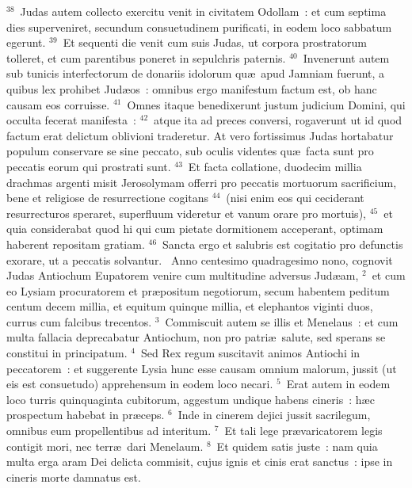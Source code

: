 ${}^{38}$~Judas autem collecto exercitu venit in civitatem Odollam~: et cum septima dies superveniret, secundum consuetudinem purificati, in eodem loco sabbatum egerunt.
${}^{39}$~Et sequenti die venit cum suis Judas, ut corpora prostratorum tolleret, et cum parentibus poneret in sepulchris paternis.
${}^{40}$~Invenerunt autem sub tunicis interfectorum de donariis idolorum qu\ae\ apud Jamniam fuerunt, a quibus lex prohibet Jud\ae os~: omnibus ergo manifestum factum est, ob hanc causam eos corruisse.
${}^{41}$~Omnes itaque benedixerunt justum judicium Domini, qui occulta fecerat manifesta~:
${}^{42}$~atque ita ad preces conversi, rogaverunt ut id quod factum erat delictum oblivioni traderetur. At vero fortissimus Judas hortabatur populum conservare se sine peccato, sub oculis videntes qu\ae\ facta sunt pro peccatis eorum qui prostrati sunt.
${}^{43}$~Et facta collatione, duodecim millia drachmas argenti misit Jerosolymam offerri pro peccatis mortuorum sacrificium, bene et religiose de resurrectione cogitans
${}^{44}$~(nisi enim eos qui ceciderant resurrecturos speraret, superfluum videretur et vanum orare pro mortuis),
${}^{45}$~et quia considerabat quod hi qui cum pietate dormitionem acceperant, optimam haberent repositam gratiam.
${}^{46}$~Sancta ergo et salubris est cogitatio pro defunctis exorare, ut a peccatis solvantur.
~Anno centesimo quadragesimo nono, cognovit Judas Antiochum Eupatorem venire cum multitudine adversus Jud\ae am,
${}^{2}$~et cum eo Lysiam procuratorem et pr\ae positum negotiorum, secum habentem peditum centum decem millia, et equitum quinque millia, et elephantos viginti duos, currus cum falcibus trecentos.
${}^{3}$~Commiscuit autem se illis et Menelaus~: et cum multa fallacia deprecabatur Antiochum, non pro patri\ae\ salute, sed sperans se constitui in principatum.
${}^{4}$~Sed Rex regum suscitavit animos Antiochi in peccatorem~: et suggerente Lysia hunc esse causam omnium malorum, jussit (ut eis est consuetudo) apprehensum in eodem loco necari.
${}^{5}$~Erat autem in eodem loco turris quinquaginta cubitorum, aggestum undique habens cineris~: h\ae c prospectum habebat in pr\ae ceps.
${}^{6}$~Inde in cinerem dejici jussit sacrilegum, omnibus eum propellentibus ad interitum.
${}^{7}$~Et tali lege pr\ae varicatorem legis contigit mori, nec terr\ae\ dari Menelaum.
${}^{8}$~Et quidem satis juste~: nam quia multa erga aram Dei delicta commisit, cujus ignis et cinis erat sanctus~: ipse in cineris morte damnatus est.


